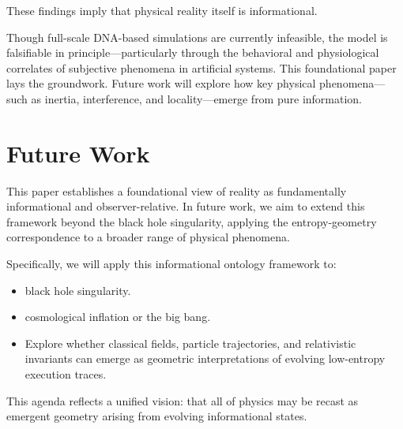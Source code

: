 \documentclass[11pt]{article}
\begin{document}
These findings imply that physical reality itself is informational.

Though full-scale DNA-based simulations are currently infeasible, the model is falsifiable in principle—particularly through the behavioral and physiological correlates of subjective phenomena in artificial systems. This foundational paper lays the groundwork. Future work will explore how key physical phenomena—such as inertia, interference, and locality—emerge from pure information.

\section*{Future Work}

This paper establishes a foundational view of reality as fundamentally informational and observer-relative. In future work, we aim to extend this framework beyond the black hole singularity, applying the entropy-geometry correspondence to a broader range of physical phenomena.

Specifically, we will apply this informational ontology framework to:

\begin{itemize}
  \item black hole singularity.
  \item cosmological inflation or the big bang.
  \item Explore whether classical fields, particle trajectories, and relativistic invariants can emerge as geometric interpretations of evolving low-entropy execution traces.
\end{itemize}

This agenda reflects a unified vision: that all of physics may be recast as emergent geometry arising from evolving informational states.
\end{document}
